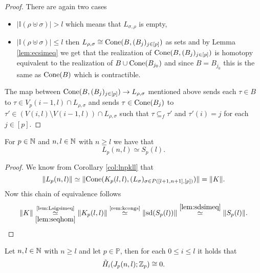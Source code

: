 \begin{proof}
  There are again two cases
  \begin{itemize}
    \item $\left|\mathbb{I}(\rho \uplus \sigma)\right| > l$ which means that $L_{\sigma,\rho}$ is empty,
    \item $\left|\mathbb{I}(\rho \uplus \sigma)\right| \leq l$ then $L_{\rho, \sigma} \cong {\rm Cone}(B, (B_j)_{j\in [p]})$ as sets and by Lemma \ref{lem:ecsimeq} we get that the realization of ${\rm Cone}(B, (B_j)_{j \in [p]})$ is homotopy equivalent to the realization of $B \cup {\rm Cone}(B_{j_0})$ and since $B = B_{j_0}$ this is the same as ${\rm Cone}(B)$ which is contractible.
    \end{itemize}
    The map between ${\rm Cone}(B, (B_j)_{j\in [p]}) \to L_{\rho, \sigma}$ mentioned above sends each $\tau \in B$ to $\tau \in V_p(i-1, l) \cap L_{\rho, \sigma}$ and sends $\tau \in {\rm Cone}(B_j)$ to $\tau' \in (V(i,l) \setminus V(i-1,l))\cap L_{\rho,\sigma}$ such that $\tau \subseteq_f \tau'$ and $\tau'(i) = j$ for each $j \in [p]$.
\end{proof}

\begin{col}
  For $p \in \mathbb{N}$ and $n,l\in \mathbb{N}$ with $n \geq l$ we have that \[L_p(n,l) \simeq S_p(l).\]
\end{col}

\begin{proof}
  We know from Corollary \ref{col:lnpkll} that \[\lVert L_p(n,l) \rVert \simeq \lVert{\rm Cone}(K_p(l,l), (L_\sigma)_{\sigma\in P([l+1,n+1],[p])})\rVert = \lVert K \rVert.\] Now this chain of equivalence follows
  \begin{equation*}
    \lVert K \rVert \underset{\ref{lem:seqhom}}{\overset{\text{\ref{lem:Lsigsimeq}}}{\simeq}} \lVert K_p(l,l) \rVert \overset{\text{\ref{rem:kcongs}}}{\simeq} \lVert {\rm sd}(S_p(l)) \rVert \overset{\ref{lem:sdsimeq}}{\simeq} \lVert S_p(l) \rVert.
  \end{equation*}
\end{proof}

\begin{lemma}\label{lem:jc0}
  Let $n,l \in \mathbb{N}$ with $n \geq l$ and let $p \in \mathbb{P}$, then for each $0 \leq i \leq l$ it holds that
  \begin{equation*}
    \tilde{H}_i(J_p(n,l); \mathbb{Z}_p) \cong 0.
  \end{equation*}
\end{lemma}

